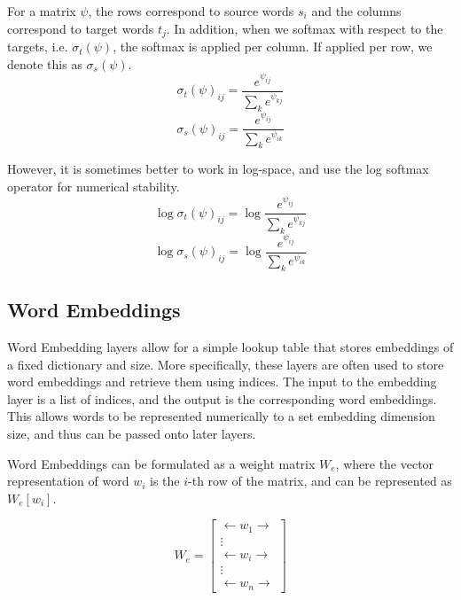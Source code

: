 \documentclass[twoside,twocolumn]{article}
\begin{document}
For a matrix $\psi$, the rows correspond to source words $s_i$ and the columns correspond to target words $t_j$. In addition, when we softmax with respect to the targets, i.e. $\sigma_t(\psi)$, the softmax is applied per column. If applied per row, we denote this as $\sigma_s(\psi)$.
\begin{equation}
  \sigma_t(\psi)_{ij} = \frac{e^{\psi_{ij}}}{\sum_{k} e^{\psi_{kj}}}
\end{equation}
\begin{equation}
  \sigma_s(\psi)_{ij} = \frac{e^{\psi_{ij}}}{\sum_{k} e^{\psi_{ik}}}
\end{equation}

However, it is sometimes better to work in log-space, and use the log softmax operator for numerical stability.
\begin{equation}
  \log \sigma_t(\psi)_{ij} = \log \frac{e^{\psi_{ij}}}{\sum_{k} e^{\psi_{kj}}}
\end{equation}
\begin{equation}
  \log \sigma_s(\psi)_{ij} = \log \frac{e^{\psi_{ij}}}{\sum_{k} e^{\psi_{ik}}}
\end{equation}

\subsection{Word Embeddings}
Word Embedding layers allow for a simple lookup table that stores embeddings of a fixed dictionary and size. More specifically, these layers are often used to store word embeddings and retrieve them using indices. The input to the embedding layer is a list of indices, and the output is the corresponding word embeddings. This allows words to be represented numerically to a set embedding dimension size, and thus can be passed onto later layers.

Word Embeddings can be formulated as a weight matrix $W_e$, where the vector representation of word $w_i$ is the $i$-th row of the matrix, and can be represented as
$W_e[w_i]$.

\begin{equation}
  W_e = \begin{bmatrix}
  \longleftarrow w_1 \longrightarrow \\
  \vdots\\
  \longleftarrow w_i \longrightarrow\\
  \vdots\\
  \longleftarrow w_n \longrightarrow
\end{bmatrix}
\end{equation}
\end{document}

